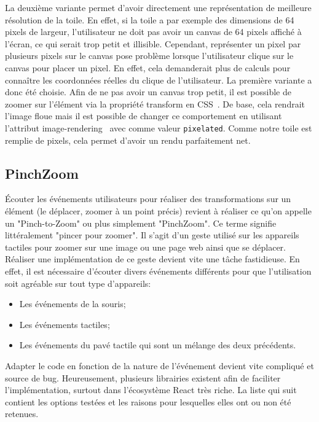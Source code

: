 La deuxième variante permet d'avoir directement une représentation de meilleure résolution de la toile. En effet, si la toile a par exemple des dimensions de 64 pixels de largeur, l'utilisateur ne doit pas avoir un canvas de 64 pixels affiché à l'écran, ce qui serait trop petit et illisible. Cependant, représenter un pixel par plusieurs pixels sur le canvas pose problème lorsque l'utilisateur clique sur le canvas pour placer un pixel. En effet, cela demanderait plus de calculs pour connaître les coordonnées réelles du clique de l'utilisateur. La première variante a donc été choisie. Afin de ne pas avoir un canvas trop petit, il est possible de zoomer sur l'élément via la propriété transform en CSS~\cite{transformcss}. De base, cela rendrait l'image floue mais il est possible de changer ce comportement en utilisant l'attribut image-rendering~\cite{image-renderingcss} avec comme valeur \texttt{pixelated}. Comme notre toile est remplie de pixels, cela permet d'avoir un rendu parfaitement net.

\subsection{PinchZoom}

Écouter les événements utilisateurs pour réaliser des transformations sur un élément (le déplacer, zoomer à un point précis) revient à réaliser ce qu'on appelle un "Pinch-to-Zoom" ou plus simplement "PinchZoom". Ce terme signifie littéralement "pincer pour zoomer". Il s'agit d'un geste utilisé sur les appareils tactiles pour zoomer sur une image ou une page web ainsi que se déplacer. Réaliser une implémentation de ce geste devient vite une tâche fastidieuse. En effet, il est nécessaire d'écouter divers événements différents pour que l'utilisation soit agréable sur tout type d'appareils:

\begin{itemize}
  \item Les événements de la souris;
  \item Les événements tactiles;
  \item Les événements du pavé tactile qui sont un mélange des deux précédents.
\end{itemize}

Adapter le code en fonction de la nature de l'événement devient vite compliqué et source de bug. Heureusement, plusieurs librairies existent afin de faciliter l'implémentation, surtout dans l'écosystème React très riche. La liste qui suit contient les options testées et les raisons pour lesquelles elles ont ou non été retenues.

